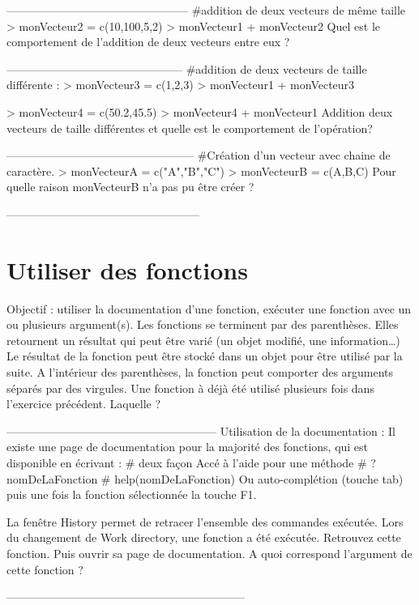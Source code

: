 \documentclass[a4paper]{article}
\begin{document}
------------------------------------------------
\#addition de deux vecteurs de même taille
> monVecteur2 = c(10,100,5,2)
> monVecteur1 + monVecteur2		
Quel est le comportement de l'addition de deux vecteurs entre eux ?

-----------------------------------------------
\#addition de deux vecteurs de taille différente :
> monVecteur3 = c(1,2,3) 
> monVecteur1 + monVecteur3
       
> monVecteur4 = c(50.2,45.5)
> monVecteur4 + monVecteur1
Addition deux vecteurs de taille différentes et quelle est le comportement de l'opération?

--------------------------------------------------
\#Création d'un vecteur avec chaine de caractère.
> monVecteurA = c("A","B","C")
> monVecteurB = c(A,B,C)
Pour quelle raison  monVecteurB n'a pas pu être créer ?


---------------------------------------------------



\section{Utiliser des fonctions}
Objectif : utiliser la documentation d'une fonction, exécuter une fonction avec un ou plusieurs argument(s).
Les fonctions se terminent par des parenthèses. Elles retournent un résultat qui peut être varié (un objet modifié, une information…)
Le résultat de la fonction peut être stocké dans un objet pour être utilisé par la suite.
A l'intérieur des parenthèses, la fonction peut comporter des arguments séparés par des virgules.
Une fonction à déjà été utilisé plusieurs fois dans l'exercice précédent. Laquelle ?

--------------------------------------------------------
Utilisation de la documentation :
Il existe une page de documentation pour la majorité des fonctions, qui est disponible en écrivant :
\# deux façon Accé à l'aide pour une méthode
\# ?nomDeLaFonction 
  \#  help(nomDeLaFonction) 
 Ou auto-complétion (touche tab) puis une fois la fonction sélectionnée la touche F1.

La fenêtre History permet de retracer l'ensemble des commandes exécutée.  Lors du changement de Work directory, une fonction a été exécutée.  Retrouvez cette fonction. Puis ouvrir sa page de documentation.
A quoi correspond l'argument de cette fonction ?

---------------------------------------------------------------
\end{document}
